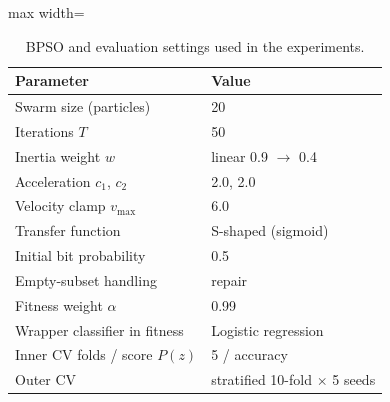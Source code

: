 \begin{table}[!t]
\centering
\caption{BPSO and evaluation settings used in the experiments.}
\label{tab:bpso_params}
\footnotesize
\setlength{\tabcolsep}{4pt}
\begin{adjustbox}{max width=\linewidth}
\begin{tabular}{ll}
\toprule
\textbf{Parameter} & \textbf{Value} \\
\midrule
Swarm size (particles) & 20 \\
Iterations $T$ & 50 \\
Inertia weight $w$ & linear 0.9 $\rightarrow$ 0.4 \\
Acceleration $c_1$, $c_2$ & 2.0, 2.0 \\
Velocity clamp $v_{\max}$ & 6.0 \\
Transfer function & S-shaped (sigmoid) \\
Initial bit probability & 0.5 \\
Empty-subset handling & repair \\
Fitness weight $\alpha$ & 0.99 \\
Wrapper classifier in fitness & Logistic regression \\
Inner CV folds / score $P(z)$ & 5 / accuracy \\
Outer CV & stratified 10-fold $\times$ 5 seeds \\
\bottomrule
\end{tabular}
\end{adjustbox}
\end{table}
